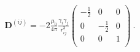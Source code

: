 \begin{align}
  \mathbf{D}^{(ij)}
  = -2 \frac{\mu_0}{4\pi}\frac{\gamma_i\gamma_j}{r_{ij}^3}
  \left(
  \begin{matrix}
    -\frac{1}{2} & 0 & 0\\
    0 & -\frac{1}{2} & 0\\
    0 & 0 & 1\\
  \end{matrix}
  \right)~.
\end{align}
